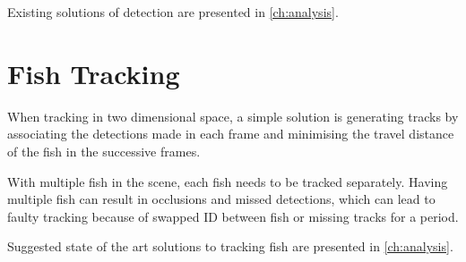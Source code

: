 Existing solutions of detection are presented in \autoref{ch:analysis}. 

\section{Fish Tracking}
When tracking in two dimensional space, a simple solution is generating tracks by associating the detections made in each frame and minimising the travel distance of the fish in the successive frames.

With multiple fish in the scene, each fish needs to be tracked separately. Having multiple fish can result in occlusions and missed detections, which can lead to faulty tracking because of swapped ID between fish or missing tracks for a period.

Suggested state of the art solutions to tracking fish are presented in \autoref{ch:analysis}.
